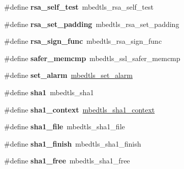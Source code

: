 \begin{DoxyCompactItemize}
\mbox{\label{compat-1_83_8h_adb6cf5eb6d08a7f03f1b20f8744c6dee}} 
\#define {\bfseries rsa\+\_\+self\+\_\+test}~mbedtls\+\_\+rsa\+\_\+self\+\_\+test
\item 
\mbox{\label{compat-1_83_8h_a0871b413a7b07384f48fbbad37a90725}} 
\#define {\bfseries rsa\+\_\+set\+\_\+padding}~mbedtls\+\_\+rsa\+\_\+set\+\_\+padding
\item 
\mbox{\label{compat-1_83_8h_a2548b1616f665afa27b5ad00841f8799}} 
\#define {\bfseries rsa\+\_\+sign\+\_\+func}~mbedtls\+\_\+rsa\+\_\+sign\+\_\+func
\item 
\mbox{\label{compat-1_83_8h_a4c53e54d0239c94880f7b739257de6ee}} 
\#define {\bfseries safer\+\_\+memcmp}~mbedtls\+\_\+ssl\+\_\+safer\+\_\+memcmp
\item 
\mbox{\label{compat-1_83_8h_ac75e2e74e971b37dd9c1cded94a1c4ff}} 
\#define {\bfseries set\+\_\+alarm}~\mbox{\hyperlink{timing_8h_a7ea7574e836da0dc51b4b16c4033ede3}{mbedtls\+\_\+set\+\_\+alarm}}
\item 
\mbox{\label{compat-1_83_8h_aa8fa98c9b77611a7e3c3dec20725badb}} 
\#define {\bfseries sha1}~mbedtls\+\_\+sha1
\item 
\mbox{\label{compat-1_83_8h_a77f593d0842e0464ffd4e4334587c182}} 
\#define {\bfseries sha1\+\_\+context}~\mbox{\hyperlink{structmbedtls__sha1__context}{mbedtls\+\_\+sha1\+\_\+context}}
\item 
\mbox{\label{compat-1_83_8h_ad137235c01d8e1fd68948c65d4e34215}} 
\#define {\bfseries sha1\+\_\+file}~mbedtls\+\_\+sha1\+\_\+file
\item 
\mbox{\label{compat-1_83_8h_aca5cbc8e6f9497097809b57f5275dad8}} 
\#define {\bfseries sha1\+\_\+finish}~mbedtls\+\_\+sha1\+\_\+finish
\item 
\mbox{\label{compat-1_83_8h_a61141cb2187642451fe00ade46858def}} 
\#define {\bfseries sha1\+\_\+free}~mbedtls\+\_\+sha1\+\_\+free
\item 
\mbox{\label{compat-1_83_8h_ada0735a6e515883cf97fa8be5491c299}} 

\end{DoxyCompactItemize}
